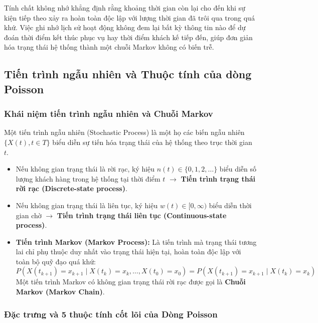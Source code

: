 Tính chất không nhớ khẳng định rằng khoảng thời gian còn lại cho đến khi sự kiện tiếp theo xảy ra hoàn toàn độc lập với lượng thời gian đã trôi qua trong quá khứ. Việc ghi nhớ lịch sử hoạt động không đem lại bất kỳ thông tin nào để dự đoán thời điểm kết thúc phục vụ hay thời điểm khách kế tiếp đến, giúp đơn giản hóa trạng thái hệ thống thành một chuỗi Markov không có biến trễ.

\newpage
\subsection{Tiến trình ngẫu nhiên và Thuộc tính của dòng Poisson}
\label{subsec:tien-trinh-poisson}

\subsubsection{Khái niệm tiến trình ngẫu nhiên và Chuỗi Markov}

\hspace{0.5cm}Một tiến trình ngẫu nhiên (Stochastic Process) là một họ các biến ngẫu nhiên $\{X(t), t \in T\}$ biểu diễn sự tiến hóa trạng thái của hệ thống theo trục thời gian $t$.
\begin{itemize}[leftmargin=1.5em]
    \item Nếu không gian trạng thái là rời rạc, ký hiệu $n(t) \in \{0, 1, 2, \dots\}$ biểu diễn số lượng khách hàng trong hệ thống tại thời điểm $t$ $\to$ \textbf{Tiến trình trạng thái rời rạc (Discrete-state process)}.
    \item Nếu không gian trạng thái là liên tục, ký hiệu $w(t) \in [0, \infty)$ biểu diễn thời gian chờ $\to$ \textbf{Tiến trình trạng thái liên tục (Continuous-state process)}.
    \item \textbf{Tiến trình Markov (Markov Process):} Là tiến trình mà trạng thái tương lai chỉ phụ thuộc duy nhất vào trạng thái hiện tại, hoàn toàn độc lập với toàn bộ quỹ đạo quá khứ:
    \begin{equation}
        P(X(t_{k+1}) = x_{k+1} \mid X(t_k) = x_k, \dots, X(t_0) = x_0) = P(X(t_{k+1}) = x_{k+1} \mid X(t_k) = x_k)
    \end{equation}
    Một tiến trình Markov có không gian trạng thái rời rạc được gọi là \textbf{Chuỗi Markov (Markov Chain)}.
\end{itemize}

\subsubsection{Đặc trưng và 5 thuộc tính cốt lõi của Dòng Poisson}

